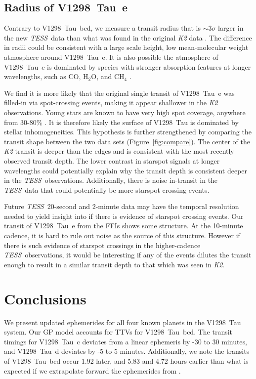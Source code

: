 \documentclass[twocolumn]{aastex631}
\newcommand{\tess}{\textit{TESS}}
\newcommand{\sname}{V1298~Tau\xspace}
\newcommand{\planetc}{V1298~Tau~c\xspace}
\newcommand{\planetd}{V1298~Tau~d\xspace}
\newcommand{\planete}{V1298~Tau~e\xspace}
\newcommand{\planetknown}{V1298~Tau~bcd\xspace}
\begin{document}
\subsection{Radius of \planete}

Contrary to \planetknown, we measure a transit radius that is $\sim 3\sigma$ larger in the new \tess\ data than what was found in the original \textit{K2} data \citep{David2019a}. The difference in radii could be consistent with a large scale height, low mean-molecular weight atmosphere around \planete \citep{deMooij12}. It is also possible the atmosphere of \planete is dominated by species with stronger absorption features at longer wavelengths, such as CO, H$_2$O, and CH$_4$ \citep{carter09}. 

We find it is more likely that the original single transit of \planete was filled-in via spot-crossing events, making it appear shallower in the \textit{K2} observations. Young stars are known to have very high spot coverage, anywhere from 30-80\% \citep[][]{grankin99, gully17, feinstein20}. It is therefore likely the surface of \sname is dominated by stellar inhomogeneities. This hypothesis is further strengthened by comparing the transit shape between the two data sets (Figure~\ref{fig:compare}). The center of the \textit{K2} transit is deeper than the edges and is consistent with the most recently observed transit depth. The lower contrast in starspot signals at longer wavelengths could potentially explain why the transit depth is consistent deeper in the \tess\ observations. Additionally, there is noise in-transit in the \tess\ data that could potentially be more starspot crossing events.


Future \tess\ 20-second and 2-minute data may have the temporal resolution needed to yield insight into if there is evidence of starspot crossing events. Our transit of \planete from the FFIs shows some structure. At the 10-minute cadence, it is hard to rule out noise as the source of this structure. However if there is such evidence of starspot crossings in the higher-cadence \tess\ observations, it would be interesting if any of the events dilutes the transit enough to result in a similar transit depth to that which was seen in \textit{K2}. 

\section{Conclusions} \label{sec:conclusions}

We present updated ephemerides for all four known planets in the \sname system. Our GP model accounts for TTVs for \planetknown. The transit timings for \planetc deviates from a linear ephemeris by -30 to 30 minutes, and \planetd deviates by -5 to 5 minutes. Additionally, we note the transits of \planetknown occur 1.92 later, and 5.83 and 4.72 hours earlier than what is expected if we extrapolate forward the ephemerides from \cite{David2019b}.
\end{document}
